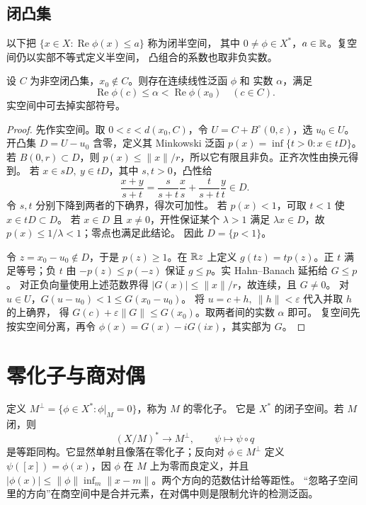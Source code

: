 \subsection{闭凸集}

以下把 \(\{x\in X:\operatorname{Re}\phi(x)\le a\}\) 称为闭半空间，
其中 \(0\ne\phi\in X^*\)，\(a\in\mathbb{R}\)。复空间仍以实部不等式定义半空间，
凸组合的系数也取非负实数。

\begin{theorem}[严格分离]\label{thm:closed-convex-separation}
设 \(C\) 为非空闭凸集，\(x_0\notin C\)。则存在连续线性泛函 \(\phi\) 和
实数 \(\alpha\)，满足
\[
 \operatorname{Re}\phi(c)\le\alpha<\operatorname{Re}\phi(x_0)
 \quad(c\in C).
\]
实空间中可去掉实部符号。
\end{theorem}
\begin{proof}
先作实空间。取 \(0<\varepsilon<d(x_0,C)\)，令
\(U=C+B^\circ(0,\varepsilon)\)，选 \(u_0\in U\)。开凸集 \(D=U-u_0\)
含零，定义其 Minkowski 泛函
\(p(x)=\inf\{t>0:x\in tD\}\)。若 \(B(0,r)\subset D\)，则
\(p(x)\le\|x\|/r\)，所以它有限且非负。正齐次性由换元得到。
若 \(x\in sD,\ y\in tD\)，其中 \(s,t>0\)，凸性给
\[
 \frac{x+y}{s+t}
 =\frac{s}{s+t}\frac{x}{s}+\frac{t}{s+t}\frac{y}{t}\in D.
\]
令 \(s,t\) 分别下降到两者的下确界，得次可加性。
若 \(p(x)<1\)，可取 \(t<1\) 使 \(x\in tD\subset D\)。
若 \(x\in D\) 且 \(x\ne0\)，开性保证某个 \(\lambda>1\) 满足
\(\lambda x\in D\)，故 \(p(x)\le1/\lambda<1\)；零点也满足此结论。
因此 \(D=\{p<1\}\)。

令 \(z=x_0-u_0\notin D\)，于是 \(p(z)\ge1\)。在 \(\mathbb{R} z\) 上定义
\(g(tz)=tp(z)\)。正 \(t\) 满足等号；负 \(t\) 由
\(-p(z)\le p(-z)\) 保证 \(g\le p\)。实 Hahn--Banach 延拓给 \(G\le p\)。
对正负向量使用上述范数界得 \(|G(x)|\le\|x\|/r\)，故连续，且 \(G\ne0\)。
对 \(u\in U\)，\(G(u-u_0)<1\le G(x_0-u_0)\)。
将 \(u=c+h,\ \|h\|<\varepsilon\) 代入并取 \(h\) 的上确界，
得 \(G(c)+\varepsilon\|G\|\le G(x_0)\)。取两者间的实数 \(\alpha\) 即可。
复空间先按实空间分离，再令 \(\phi(x)=G(x)-iG(ix)\)，其实部为 \(G\)。
\end{proof}

\section{零化子与商对偶}

定义 \(M^\perp=\{\phi\in X^*:\phi|_M=0\}\)，称为 \(M\) 的零化子。
它是 \(X^*\) 的闭子空间。若 \(M\) 闭，则
\[
 (X/M)^*\longrightarrow M^\perp,\qquad \psi\longmapsto\psi\circ q
\]
是等距同构。它显然单射且像落在零化子；反向对 \(\phi\in M^\perp\)
定义 \(\psi([x])=\phi(x)\)，因 \(\phi\) 在 \(M\) 上为零而良定义，并且
\(|\phi(x)|\le\|\phi\|\inf_m\|x-m\|\)。两个方向的范数估计给等距性。
“忽略子空间里的方向”在商空间中是合并元素，在对偶中则是限制允许的检测泛函。

